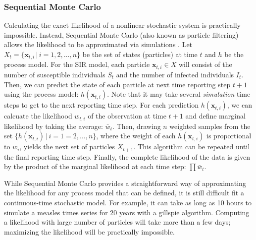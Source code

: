 \documentclass{article}
\begin{document}
\subsubsection*{Sequential Monte Carlo}

Calculating the exact likelihood of a nonlinear stochastic system is practically impossible.
Instead, Sequential Monte Carlo (also known as particle filtering) allows the likelihood to be approximated via simulations \citep{doucet2001introduction, arulampalam2002tutorial}.
Let $X_t = \{\mathbf{x}_{t, i} \,|\, i= 1, 2, \dots, n\}$ be the set of states (particles) at time $t$ and $h$ be the process model.
For the SIR model, each particle $\mathbf{x}_{t, i} \in X$ will consist of the number of susceptible individuals $S_t$ and the number of infected individuals $I_t$.
Then, we can predict the state of each particle at next time reporting step $t+1$ using the process model: $h(\mathbf{x}_{t, i})$.
Note that it may take several \emph{simulation} time steps to get to the next reporting time step.
For each prediction $h(\mathbf{x}_{t, i})$, we can calcuate the likelihood $w_{t,i}$ of the observation at time $t+1$ and define marginal likelihood by taking the average: $\bar{w}_t$.
Then, drawing $n$ weighted samples from the set $\{h(\mathbf{x}_{t, i}) \,|\, i = 1=2, \dots, n\}$, where the weight of each $h(\mathbf{x}_{t, i})$ is proportional to $w_i$, yields the next set of particles $X_{t+1}$.
This algorithm can be repeated until the final reporting time step.
Finally, the complete likelihood of the data is given by the product of the marginal likelihood at each time step: $\prod \bar{w}_{t}$.

While Sequential Monte Carlo provides a straightforward way of approximating the likelihood for any process model that can be defined, it is still difficult fit a continuous-time stochastic model. 
For example, it can take as long as 10 hours to simulate a measles times series for 20 years with a gillspie algorithm.
Computing a likelihood with large number of particles will take more than a few days; 
maximizing the likelihood will be practically impossible.
\end{document}
